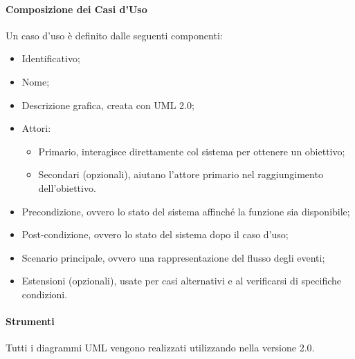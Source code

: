 \paragraph{Composizione dei Casi d'Uso} \hfill \break
Un caso d'uso è definito dalle seguenti componenti: 
\begin{itemize}
  \item Identificativo;
  \item Nome;
  \item Descrizione grafica, creata con UML 2.0;
  \item Attori:
  \begin{itemize}
    \item Primario, interagisce direttamente col sistema per ottenere un obiettivo;
    \item Secondari (opzionali), aiutano l'attore primario nel raggiungimento dell'obiettivo.
  \end{itemize}
    \item Precondizione, ovvero lo stato del sistema affinché la funzione sia disponibile;
    \item Post-condizione, ovvero lo stato del sistema dopo il caso d'uso;
    \item Scenario principale, ovvero una rappresentazione del flusso degli eventi;
    \item Estensioni (opzionali), usate per casi alternativi e al verificarsi di specifiche condizioni.
  \end{itemize}
  
\paragraph{Strumenti} \hfill \break
Tutti i diagrammi UML vengono realizzati utilizzando  nella versione 2.0.

